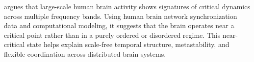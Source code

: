 \documentclass[a4paper]{article}
\title{}
\date{}
\begin{document}
    \maketitle
    \cite{kitzbichler-2009-broadband-criticality-of-human-brain-network-synchronization} argues that large-scale human brain activity shows signatures of critical dynamics across multiple frequency bands. Using human brain network synchronization data and computational modeling, it suggests that the brain operates near a critical point rather than in a purely ordered or disordered regime. This near-critical state helps explain scale-free temporal structure, metastability, and flexible coordination across distributed brain systems.
    
    
\end{document}
